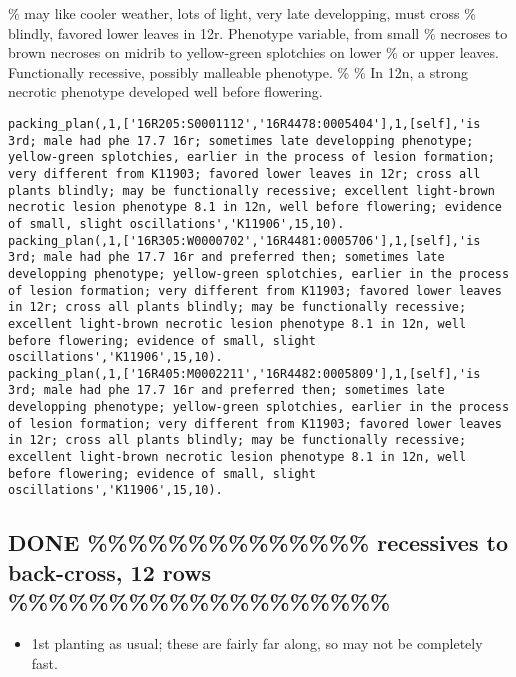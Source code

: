 \documentclass[11pt]{article}
\begin{document}
\% may like cooler weather, lots of light, very late developping, must cross
\% blindly, favored lower leaves in 12r.  Phenotype variable, from small
\% necroses to brown necroses on midrib to yellow-green splotchies on lower
\% or upper leaves.  Functionally recessive, possibly malleable phenotype.
\%
\% In 12n, a strong necrotic phenotype developed well before flowering.


\begin{verbatim}
packing_plan(,1,['16R205:S0001112','16R4478:0005404'],1,[self],'is 3rd; male had phe 17.7 16r; sometimes late developping phenotype; yellow-green splotchies, earlier in the process of lesion formation; very different from K11903; favored lower leaves in 12r; cross all plants blindly; may be functionally recessive; excellent light-brown necrotic lesion phenotype 8.1 in 12n, well before flowering; evidence of small, slight oscillations','K11906',15,10).
packing_plan(,1,['16R305:W0000702','16R4481:0005706'],1,[self],'is 3rd; male had phe 17.7 16r and preferred then; sometimes late developping phenotype; yellow-green splotchies, earlier in the process of lesion formation; very different from K11903; favored lower leaves in 12r; cross all plants blindly; may be functionally recessive; excellent light-brown necrotic lesion phenotype 8.1 in 12n, well before flowering; evidence of small, slight oscillations','K11906',15,10).
packing_plan(,1,['16R405:M0002211','16R4482:0005809'],1,[self],'is 3rd; male had phe 17.7 16r and preferred then; sometimes late developping phenotype; yellow-green splotchies, earlier in the process of lesion formation; very different from K11903; favored lower leaves in 12r; cross all plants blindly; may be functionally recessive; excellent light-brown necrotic lesion phenotype 8.1 in 12n, well before flowering; evidence of small, slight oscillations','K11906',15,10).
\end{verbatim}



\subsection{{\bfseries\sffamily DONE} \%\%\%\%\%\%\%\%\%\%\%\%\%\% recessives to back-cross, 12 rows  \%\%\%\%\%\%\%\%\%\%\%\%\%\%\%\%\%\%\%}
\label{sec-4-4}

\begin{itemize}
\item 1st planting as usual; these are fairly far along, so may not be
completely fast.
\end{itemize}
\end{document}
